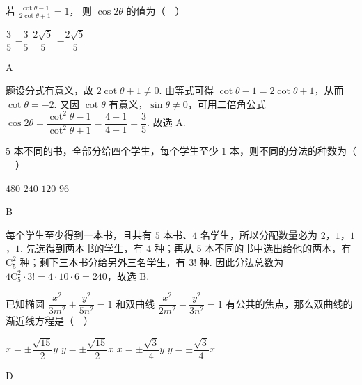 \begin{problem}
若 \(\displaystyle \frac{\cot\theta-1}{2\cot\theta+1}=1\)，
则 \(\cos 2\theta\) 的值为（\(\quad\)）

\choices
    {\(\dfrac{3}{5}\)}
    {\(-\dfrac{3}{5}\)}
    {\(\dfrac{2\sqrt{5}}{5}\)}
    {\(-\dfrac{2\sqrt{5}}{5}\)}
\end{problem}

\begin{answer}
A
\end{answer}

\begin{solution}
题设分式有意义，故 \(2\cot\theta+1\ne0\). 由等式可得 \(\cot\theta-1=2\cot\theta+1\)，从而 \(\cot\theta=-2\). 又因 \(\cot\theta\) 有意义，\(\sin\theta\ne0\)，可用二倍角公式
\(\cos2\theta=\dfrac{\cot^2\theta-1}{\cot^2\theta+1}=\dfrac{4-1}{4+1}=\dfrac{3}{5}\). 故选 A.
\end{solution}

\begin{problem}
\(5\) 本不同的书，全部分给四个学生，每个学生至少 \(1\) 本，则不同的分法的种数为（\(\quad\)）

\choices
    {\(480\)}
    {\(240\)}
    {\(120\)}
    {\(96\)}
\end{problem}

\begin{answer}
B
\end{answer}

\begin{solution}
每个学生至少得到一本书，且共有 \(5\) 本书、\(4\) 名学生，所以分配数量必为 \(2\)，\(1\)，\(1\)，\(1\). 先选得到两本书的学生，有 \(4\) 种；再从 \(5\) 本不同的书中选出给他的两本，有 \(\mathrm C_5^2\) 种；剩下三本书分给另外三名学生，有 \(3!\) 种. 因此分法总数为 \(4\mathrm C_5^2\cdot3!=4\cdot10\cdot6=240\)，故选 B.
\end{solution}

\begin{problem}
已知椭圆 \(\dfrac{x^{2}}{3m^{2}}+\dfrac{y^{2}}{5n^{2}}=1\) 和双曲线 \(\dfrac{x^{2}}{2m^{2}}-\dfrac{y^{2}}{3n^{2}}=1\) 有公共的焦点，那么双曲线的渐近线方程是（\(\quad\)）

\choices
    {\(x=\pm\dfrac{\sqrt{15}}{2}y\)}
    {\(y=\pm\dfrac{\sqrt{15}}{2}x\)}
    {\(x=\pm\dfrac{\sqrt{3}}{4}y\)}
    {\(y=\pm\dfrac{\sqrt{3}}{4}x\)}
\end{problem}

\begin{answer}
D
\end{answer}

